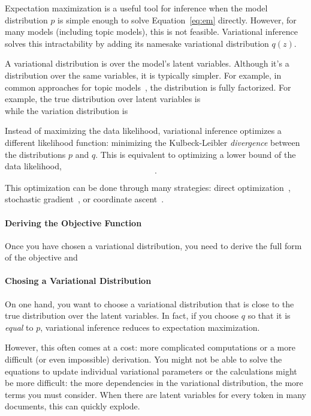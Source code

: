 Expectation maximization is a useful tool for inference when the model
distribution $p$ is simple enough to solve Equation~\ref{eq:em}
directly.  However, for many models (including topic models), this is
not feasible.  Variational inference solves this intractability by
adding its namesake variational distribution $q(z)$.

A variational distribution is over the model's latent variables.
Although it's a distribution over the same variables, it is typically
simpler.  For example, in common approaches for topic models~\citep{}, the
distribution is fully factorized.  For example, the true distribution
over latent variables is
\begin{equation}

\end{equation}
while the variation distribution is
\begin{equation}

\end{equation}

Instead of maximizing the data likelihood, variational inference
optimizes a different likelihood function: minimizing the Kulbeck-Leibler
\emph{divergence} between the distributions $p$ and $q$.  This is
equivalent to optimizing a lower bound of the data likelihood,
\begin{equation}
.
\end{equation}

This optimization can be done through many strategies: direct
optimization~\cite{}, stochastic gradient~\cite{}, or coordinate
ascent~\cite{}.

\paragraph{Deriving the Objective Function}

Once you have chosen a variational distribution, you need to derive
the full form of the objective and

\paragraph{Chosing a Variational Distribution}

On one hand, you want to choose a variational distribution that is
close to the true distribution over the latent variables.  In fact, if
you choose $q$ so that it is \emph{equal} to $p$, variational
inference reduces to expectation maximization.

However, this often comes at a cost: more complicated computations or
a more difficult (or even impossible) derivation.  You might not be
able to solve the equations to update individual variational
parameters or the calculations might be more difficult: the more
dependencies in the variational distribution, the more terms you must
consider.  When there are latent variables for every token in many
documents, this can quickly explode.

